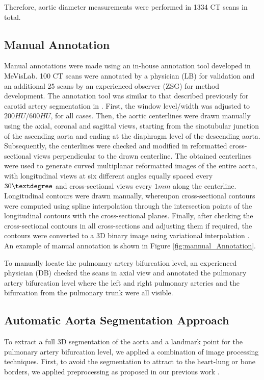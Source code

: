 Therefore, aortic diameter measurements were performed in 1334 CT scans in total. 


\subsection{Manual Annotation}
Manual annotations were made using an in-house annotation tool developed in MeVisLab. 100 CT scans were annotated by a physician (LB) for validation and an additional 25 scans by an experienced observer (ZSG) for method development. The annotation tool was similar to that described previously for carotid artery segmentation in \autocite{hameeteman2011evaluation}. First, the window level/width was adjusted to $200HU/600HU$, for all cases. Then, the aortic centerlines were drawn manually using the axial, coronal and sagittal views, starting from the sinotubular junction of the ascending aorta and ending at the diaphragm level of the descending aorta. Subsequently, the centerlines were checked and modified in reformatted cross-sectional views perpendicular to the drawn centerline. The obtained centerlines were used to generate curved multiplanar reformatted images of the entire aorta, with longitudinal views at six different angles equally spaced every $30\textdegree$ and cross-sectional views every $1 mm$ along the centerline. Longitudinal contours were drawn manually, whereupon cross-sectional contours were computed using spline interpolation through the intersection points of the longitudinal contours with the cross-sectional planes. Finally, after checking the cross-sectional contours in all cross-sections and adjusting them if required, the contours were converted to a 3D binary image using variational interpolation \autocite{heckel2011interactive}. An example of manual annotation is shown in Figure \cref{fig:mannual_Annotation}.

To manually locate the pulmonary artery bifurcation level, an experienced physician (DB) checked the scans in axial view and annotated the pulmonary artery bifurcation level where the left and right pulmonary arteries and the bifurcation from the pulmonary trunk were all visible.

\subsection{Automatic Aorta Segmentation Approach}
To extract a full 3D segmentation of the aorta and a landmark point for the pulmonary artery bifurcation level, we applied a combination of image processing techniques. First, to avoid the segmentation to attract to the heart-lung or bone borders, we applied preprocessing as proposed in our previous work \autocite{sedghi2018aorta}.


